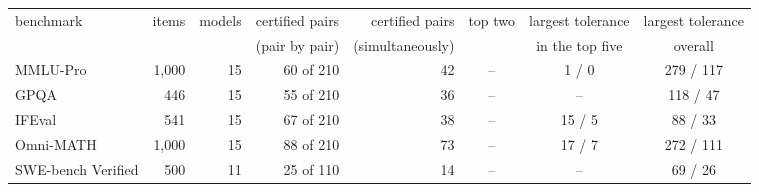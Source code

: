 \begin{tabular}{lrrrrccc}
\toprule
benchmark & items & models & certified pairs & certified pairs & top two & largest tolerance & largest tolerance \\
 & & & (pair by pair) & (simultaneously) & & in the top five & overall \\
\midrule
MMLU-Pro & 1,000 & 15 & 60 of 210 & 42 & -- & 1 / 0 & 279 / 117 \\
GPQA & 446 & 15 & 55 of 210 & 36 & -- & -- & 118 / 47 \\
IFEval & 541 & 15 & 67 of 210 & 38 & -- & 15 / 5 & 88 / 33 \\
Omni-MATH & 1,000 & 15 & 88 of 210 & 73 & -- & 17 / 7 & 272 / 111 \\
SWE-bench Verified & 500 & 11 & 25 of 110 & 14 & -- & -- & 69 / 26 \\
\bottomrule
\end{tabular}